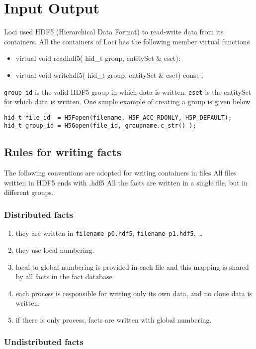 \chapter {Input Output}
Loci used HDF5 (Hierarchical Data Format)  to read-write data from its 
containers. All the containers of Loci has the following member virtual functions
%
\begin{itemize} 
\item virtual void readhdf5( hid\_t group, entitySet \&  eset);
\item virtual void writehdf5( hid\_t group, entitySet \& eset) const ;
\end{itemize}
%
{\tt group\_id} is the valid HDF5 group in which data is written. {\tt eset} is
the entitySet for which data is written. One simple example of
creating a group is given below
%
\begin{verbatim} 
hid_t file_id  = H5Fopen(filename, H5F_ACC_RDONLY, H5P_DEFAULT);
hid_t group_id = H5Gopen(file_id, groupname.c_str() );
\end{verbatim} 

\section {Rules for writing facts}
The following conventions are adopted for writing containers in files
All files written in HDF5 ends with .hdf5
All the facts are written in a single file, but in different groups.
\subsection {Distributed facts}
\begin{enumerate}
\item they are written in {\tt filename\_p0.hdf5}, {\tt filename\_p1.hdf5}, \dots
\item they use local numbering.
\item local to global numbering is provided in each file and this
mapping is shared by all facts in the fact database.
\item each process is responsible for writing only its own data, and
no clone data is written.
\item if there is only process, facts are written with global numbering.
\end{enumerate}

\subsection {Undistributed facts}

